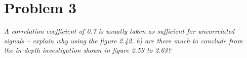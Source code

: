 \section{Problem 3}
\textit{A correlation coefficient of 0.7 is usually taken as sufficient for uncorrelated signals – explain why using the figure 2.42. b) are there much to conclude from the in-depth investigation shown in figure 2.59 to 2.63?}\\

